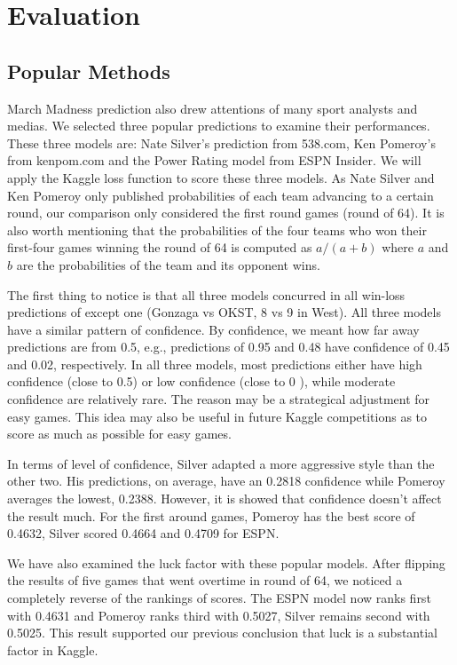\section{Evaluation}
\subsection{Popular Methods}
March Madness prediction also drew attentions of many sport analysts and medias. We selected three popular predictions to examine their performances. These three models are: Nate Silver's prediction from 538.com, Ken Pomeroy's from kenpom.com and the Power Rating model from ESPN Insider. We will apply the Kaggle loss function to score these three models. As Nate Silver and Ken Pomeroy only published probabilities of each team advancing to a certain round, our comparison only considered the first round games (round of 64). It is also worth mentioning that the probabilities of the four teams who won their first-four games winning the round of 64 is computed as \(a/(a+b)\) where \(a\) and \(b\) are the probabilities of the team and its opponent wins. 

The first thing to notice is that all three models concurred in all win-loss predictions of except one (Gonzaga vs OKST, 8 vs 9 in West). All three models have a similar pattern of confidence. By confidence, we meant how far away predictions are from 0.5, e.g., predictions of 0.95 and 0.48 have confidence of 0.45 and 0.02, respectively. In all three models, most predictions either have high confidence (close to 0.5) or low confidence (close to 0 ), while moderate confidence are relatively rare. The reason may be a strategical adjustment for easy games. This idea may also be useful in future Kaggle competitions as to score as much as possible for easy games.

In terms of level of confidence, Silver adapted a more aggressive style than the other two. His predictions, on average, have an 0.2818 confidence while Pomeroy averages the lowest, 0.2388. However, it is showed that confidence doesn't affect the result much. For the first around games, Pomeroy has the best score of 0.4632, Silver scored 0.4664 and 0.4709 for ESPN. 

We have also examined the luck factor with these popular models. After flipping the results of five games that went overtime in round of 64, we noticed a completely reverse of the rankings of scores. The ESPN model now ranks first with 0.4631 and Pomeroy ranks third with 0.5027, Silver remains second with 0.5025. This result supported our previous conclusion that luck is a substantial factor in Kaggle. 

